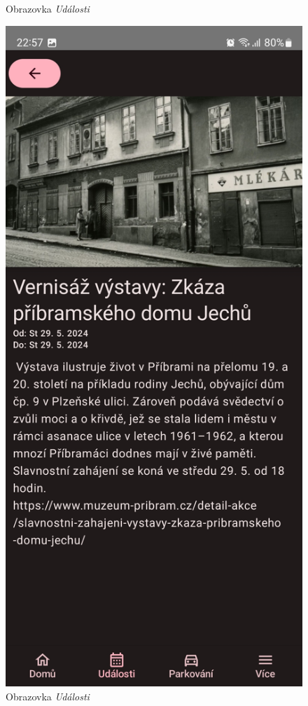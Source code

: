 \begin{figure}[H]
    \caption{Obrazovka \textit{Události}}
  \endminipage\hfill
    \includegraphics[width=\linewidth]{screens/2c_B.jpg}
    \caption{Obrazovka \textit{Události}}
  \endminipage\hfill
\end{figure}


